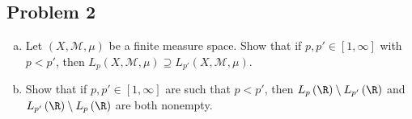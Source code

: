 \documentclass[10pt]{mypackage}
\begin{document}
\subsection{Problem 2}%
\begin{problem}\hfill
  \begin{enumerate}[(a)]
    \item Let $\left( X,\mathcal{M},\mu \right)$ be a finite measure space. Show that if $p,p'\in [1,\infty]$ with $p < p'$, then $L_p\left( X,\mathcal{M},\mu \right) \supseteq L_{p'}\left( X,\mathcal{M},\mu \right)$.
    \item Show that if $p,p'\in [1,\infty]$ are such that $p < p'$, then $L_p\left( \R \right)\setminus L_{p'}\left( \R \right)$ and $L_{p'}\left( \R \right)\setminus L_p\left( \R \right)$ are both nonempty.
  \end{enumerate}
\end{problem}
\end{document}
